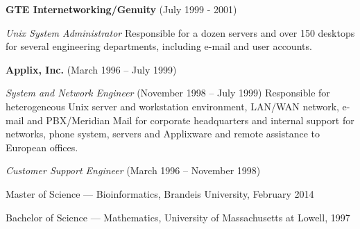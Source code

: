\documentclass[11pt,article,oneside]{memoir}
\begin{document}
\ind \textbf{GTE Internetworking/Genuity} (July 1999 - 2001)

\noindent\textit{Unix System Administrator} Responsible for a dozen
servers and over 150 desktops for several engineering departments,
including e-mail and user accounts.

\ind \textbf{Applix, Inc.} (March 1996 -- July 1999)

\noindent\textit{System and Network Engineer} (November 1998 -- July
1999) Responsible for heterogeneous Unix server and workstation
environment, LAN/WAN network, e-mail and PBX/Meridian Mail for
corporate headquarters and internal support for networks, phone
system, servers and Applixware and remote assistance to European
offices.

\noindent\textit{Customer Support Engineer} (March 1996 -- November
1998)

\bigskip



\ind Master of Science --- Bioinformatics, Brandeis University, February 2014

\ind Bachelor of Science --- Mathematics, University of Massachusetts at Lowell, 1997
\end{document}

